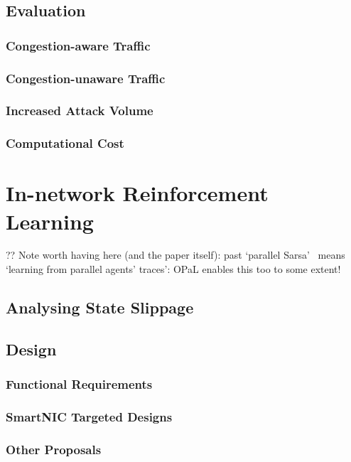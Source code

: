 \documentclass[twoside,hidelinks]{glasgowthesis}
\begin{document}
\section{Evaluation}
\subsection{Congestion-aware Traffic}
\subsection{Congestion-unaware Traffic}
\subsection{Increased Attack Volume}
\subsection{Computational Cost}

\chapter{In-network Reinforcement Learning}\label{chap:in-net-rl}

?? Note worth having here (and the paper itself): past `parallel Sarsa'~\parencite{DBLP:conf/aamas/GroundsK07} means `learning from parallel agents' traces': OPaL enables this too to some extent!

\section{Analysing State Slippage}

\section{Design}

\subsection{Functional Requirements}

\subsection{SmartNIC Targeted Designs}

\subsection{Other Proposals}
\end{document}
